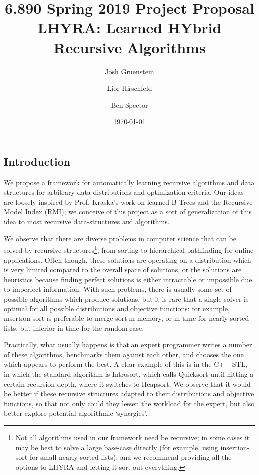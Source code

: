 \documentclass{article}
\title{6.890 Spring 2019 Project Proposal \\ LHYRA: Learned HYbrid Recursive Algorithms}
\author{Josh Gruenstein \and Lior Hirschfeld \and Ben Spector}
\date{\today}
\begin{document}
\maketitle

\subsection*{Introduction}

We propose a framework for automatically learning recursive algorithms and data structures for arbitrary data distributions and optimization criteria. Our ideas are loosely inspired by Prof. Kraska’s work on learned B-Trees and the Recursive Model Index (RMI); we conceive of this project as a sort of generalization of this idea to most recursive data-structures and algorithms.
	
We observe that there are diverse problems in computer science that can be solved by recursive structures\footnote{Not all algorithms used in our framework need be recursive; in some cases it may be best to solve a large base-case directly (for example, using insertion-sort for small nearly-sorted lists), and we recommend providing all the options to LHYRA and letting it sort out everything.}, from sorting to hierarchical pathfinding for online applications. Often though, these solutions are operating on a distribution which is very limited compared to the overall space of solutions, or the solutions are heuristics because finding perfect solutions is either intractable or impossible due to imperfect information. With such problems, there is usually some set of possible algorithms which produce solutions, but it is rare that a single solver is optimal for all possible distributions and objective functions: for example, insertion sort is preferable to merge sort in memory, or in time for nearly-sorted lists, but inferior in time for the random case.

Practically, what usually happens is that an expert programmer writes a number of these algorithms, benchmarks them against each other, and chooses the one which appears to perform the best. A clear example of this is in the C++ STL, in which the standard algorithm is Introsort, which calls Quicksort until hitting a certain recursion depth, where it switches to Heapsort. We observe that it would be better if these recursive structures adapted to their distributions and objective functions, so that not only could they lessen the workload for the expert, but also better explore potential algorithmic `synergies'.
	
\end{document}

